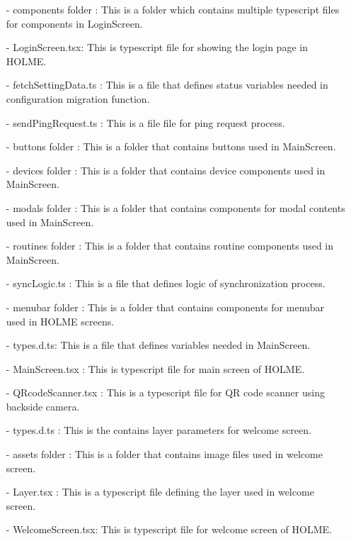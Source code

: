 \documentclass[conference]{IEEEtran}
\begin{document}
\begin{enumerate}
        \item[-] components folder : This is a folder which contains multiple typescript files for components in LoginScreen. \\
        \item[-] LoginScreen.tsx: This is typescript file for showing the login page in HOLME.\\
        \item[-] fetchSettingData.ts : This is a file that defines status variables needed in configuration migration function.\\
        \item[-] sendPingRequest.ts : This is a file file for ping request process.\\
        \item[-] buttons folder : This is a folder that contains buttons used in MainScreen.\\
        \item[-] devices folder : This is a folder that contains device components used in MainScreen.\\
        \item[-] modals folder : This is a folder that contains components for modal contents used in MainScreen.\\
        \item[-] routines folder : This is a folder that contains routine components used in MainScreen.\\
        \item[-] syncLogic.ts : This is a file that defines logic of synchronization process.\\
        \item[-] menubar folder : This is a folder that contains components for menubar used in HOLME screens.\\
        \item[-] types.d.ts: This is a file that defines variables needed in MainScreen.\\
        \item[-] MainScreen.tsx : This is typescript file for main screen of HOLME.\\
        \item[-] QRcodeScanner.tsx : This is a  typescript file for QR code scanner using backside camera.\\
        \item[-] types.d.ts : This is the contains layer parameters for welcome screen.\\
        \item[-] assets folder : This is a folder that contains image files used in welcome screen.\\
        \item[-] Layer.tsx : This is a typescript file defining the layer used in welcome screen. \\
        \item[-] WelcomeScreen.tsx: This is typescript file for welcome screen of HOLME.\\
\end{enumerate}
\vspace{10cm}
\end{document}
